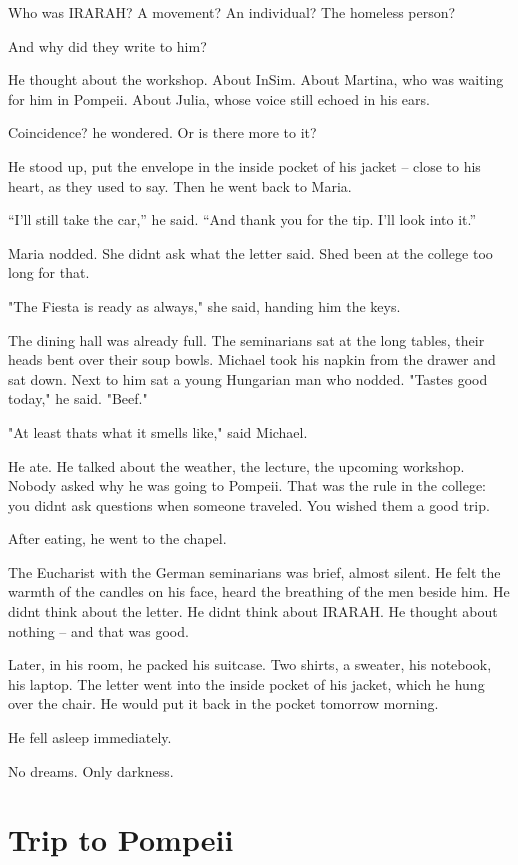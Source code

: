 \documentclass[
]{article}
\begin{document}
Who was IRARAH? A movement? An individual? The homeless person?

And why did they write to him?

He thought about the workshop. About InSim. About Martina, who was waiting for him in Pompeii. About Julia, whose voice still echoed in his ears.

Coincidence? he wondered. Or is there more to it?

He stood up, put the envelope in the inside pocket of his jacket -- close to his heart, as they used to say. Then he went back to Maria.

``I'll still take the car,'' he said. ``And thank you for the tip. I'll look into it.''

Maria nodded. She didn\textquotesingle t ask what the letter said. She\textquotesingle d been at the college too long for that.

"The Fiesta is ready as always," she said, handing him the keys.

The dining hall was already full. The seminarians sat at the long tables, their heads bent over their soup bowls. Michael took his napkin from the drawer and sat down. Next to him sat a young Hungarian man who nodded. "Tastes good today," he said. "Beef."

"At least that\textquotesingle s what it smells like," said Michael.

He ate. He talked about the weather, the lecture, the upcoming workshop. Nobody asked why he was going to Pompeii. That was the rule in the college: you didn\textquotesingle t ask questions when someone traveled. You wished them a good trip.

After eating, he went to the chapel.

The Eucharist with the German seminarians was brief, almost silent. He felt the warmth of the candles on his face, heard the breathing of the men beside him. He didn\textquotesingle t think about the letter. He didn\textquotesingle t think about IRARAH. He thought about nothing -- and that was good.

Later, in his room, he packed his suitcase. Two shirts, a sweater, his notebook, his laptop. The letter went into the inside pocket of his jacket, which he hung over the chair. He would put it back in the pocket tomorrow morning.

He fell asleep immediately.

No dreams. Only darkness.

\section{Trip to Pompeii}\label{trip-to-pompeii}
\end{document}

